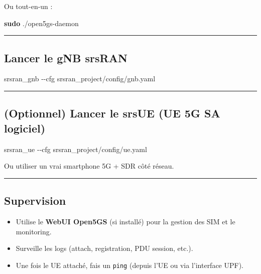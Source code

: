 \documentclass[
]{article}
\newenvironment{Shaded}{\begin{snugshade}}{\end{snugshade}}
\newcommand{\AttributeTok}[1]{\textcolor[rgb]{0.13,0.29,0.53}{#1}}
\newcommand{\ExtensionTok}[1]{#1}
\newcommand{\FunctionTok}[1]{\textcolor[rgb]{0.13,0.29,0.53}{\textbf{#1}}}
\newcommand{\NormalTok}[1]{#1}
\providecommand{\tightlist}{%
  \setlength{\itemsep}{0pt}\setlength{\parskip}{0pt}}
\begin{document}
Ou tout-en-un :

\begin{Shaded}
\begin{Highlighting}[]
\FunctionTok{sudo}\NormalTok{ ./open5gs{-}daemon}
\end{Highlighting}
\end{Shaded}

\begin{center}\rule{0.5\linewidth}{0.5pt}\end{center}

\subsection{Lancer le gNB srsRAN}\label{lancer-le-gnb-srsran}

\begin{Shaded}
\begin{Highlighting}[]
\ExtensionTok{srsran\_gnb} \AttributeTok{{-}{-}cfg}\NormalTok{ srsran\_project/config/gnb.yaml}
\end{Highlighting}
\end{Shaded}

\begin{center}\rule{0.5\linewidth}{0.5pt}\end{center}

\subsection{(Optionnel) Lancer le srsUE (UE 5G SA
logiciel)}\label{optionnel-lancer-le-srsue-ue-5g-sa-logiciel}

\begin{Shaded}
\begin{Highlighting}[]
\ExtensionTok{srsran\_ue} \AttributeTok{{-}{-}cfg}\NormalTok{ srsran\_project/config/ue.yaml}
\end{Highlighting}
\end{Shaded}

Ou utiliser un vrai smartphone 5G + SDR côté réseau.

\begin{center}\rule{0.5\linewidth}{0.5pt}\end{center}

\subsection{Supervision}\label{supervision}

\begin{itemize}
\tightlist
\item
  Utilise le \textbf{WebUI Open5GS} (si installé) pour la gestion des
  SIM et le monitoring.
\item
  Surveille les logs (attach, registration, PDU session, etc.).
\item
  Une fois le UE attaché, fais un \texttt{ping} (depuis l'UE ou via
  l'interface UPF).
\end{itemize}
\end{document}
